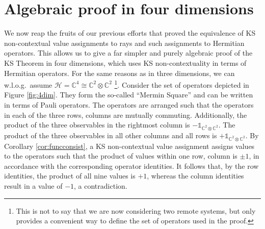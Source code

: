 \section{Algebraic proof in four dimensions}
\label{sec:4dim}
We now reap the fruits of our previous efforts that proved the equivalence of KS non-contextual value assignments to rays and such assignments to Hermitian operators. This allows us to give a far simpler and purely algebraic proof of the KS Theorem in four dimensions, which uses KS non-contextuality in terms of Hermitian operators. For the same reasons as in three dimensions, we can w.l.o.g.\ assume $\mathcal{H=\mathbb{C}}^{4}\cong\mathbb{C}^{2}\otimes\mathbb{C}^{2}$ \footnote{This is not to say that we are now considering two remote systems, but only provides a convenient way to define the set of operators used in the proof.}. Consider the set of operators depicted in Figure \ref{fig:4dim}. They form the so-called “Mermin Square” \cite{Mermin1993} and can be written in terms of Pauli operators. The operators are arranged such that the operators in each of the three rows, columns are mutually commuting. Additionally, the product of the three observables in the rightmost column is $-\mathbb{1}_{\mathbb{C}^{2}\otimes\mathbb{C}^{2}}$. The product of the three observables in all other columns and all rows is $+\mathbb{1}_{\mathbb{C}^{2}\otimes\mathbb{C}^{2}}$. By Corollary \ref{cor:funcconsist}, a KS non-contextual value assignment assigns values to the operators such that the product of values within one row, column is $\pm1$, in accordance with the corresponding operator identities. It follows that, by the row identities, the product of all nine values is $+1$, whereas the column identities result in a value of $-1$, a contradiction.

